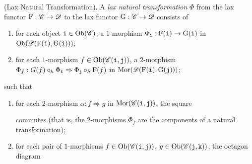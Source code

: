 \noindent\begin{definition}\textup{(Lax Natural Transformation).} A {\em lax natural transformation} $\Phi$ from the lax functor $\textup{F} : \mathscr{C} \to \mathscr{D}$ to the lax functor $\textup{G} : \mathscr{C} \to \mathscr{D}$ consists of
\begin{enumerate}[label=$\bullet$, leftmargin=4\parindent]
\item for each object $\textnormal{\texttt{i}} \in \textnormal{Ob}(\mathscr{C})$, a $1$-morphism $\Phi_{\textnormal{\texttt{i}}} : \textup{F}(\textnormal{\texttt{i}}) \to \textup{G}(\textnormal{\texttt{i}})$ in $\textnormal{Ob}(\mathscr{D}(\textup{F}(\textnormal{\texttt{i}}), \textup{G}(\textnormal{\texttt{i}})))$;
\item for each $1$-morphism $f \in \textnormal{Ob}(\mathscr{C}(\textnormal{\texttt{i}}, \textnormal{\texttt{j}}))$, a $2$-morphism $\Phi_f : G(f) \circ_h \Phi_{\textnormal{\texttt{i}}} \Rightarrow \Phi_{\textnormal{\texttt{j}}} \circ_h \textup{F}(f)$ %
in $\textnormal{Mor}(\mathscr{D}(\textup{F}(\textnormal{\texttt{i}}), \textup{G}(\textnormal{\texttt{j}})))$;
\end{enumerate}
\noindent such that
\begin{enumerate}[label=$\bullet$, leftmargin=4\parindent]
\item for each $2$-morphism $\alpha : f \Rightarrow g$ in $\textnormal{Mor}(\mathscr{C}(\textnormal{\texttt{i}}, \textnormal{\texttt{j}}))$, the square
\begin{center}
\end{center}
commutes (that is, the $2$-morphisms $\Phi_f$ are the components of a natural transformation);
\item for each pair of $1$-morphisms $f \in \textnormal{Ob}(\mathscr{C}(\textnormal{\texttt{i}}, \textnormal{\texttt{j}}))$, $g \in \textnormal{Ob}(\mathscr{C}(\textnormal{\texttt{j}}, \textnormal{\texttt{k}}))$, the octagon diagram

\end{enumerate}
\end{definition}
